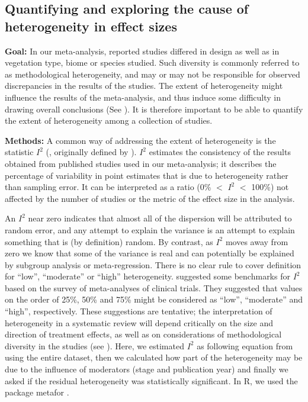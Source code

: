 \documentclass[10pt,twoside]{article}\usepackage[]{graphicx}\usepackage[]{color}
\begin{document}
\subsection{Quantifying and exploring the cause of heterogeneity in effect sizes}\label{app:heterogeneity}

\noindent\textbf{Goal:} In our meta-analysis, reported studies differed in design as well as in vegetation type, biome or species studied. Such diversity is commonly referred to as methodological heterogeneity, and may or may not be responsible for observed discrepancies in the results of the studies. The extent of heterogeneity might influence the results of the meta-analysis, and thus induce some difficulty in drawing overall conclusions (See \citealt{Higgins:2002iq}). It is therefore important to be able to quantify the extent of heterogeneity among a collection of studies.

\noindent\textbf{Methods:} A common way of addressing the extent of heterogeneity is the statistic $I^{2}$ (\citealt{Santos:2012gt}, originally defined by \citealt{Higgins:2002iq}). $I^{2}$ estimates the consistency of the results obtained from published studies used in our meta-analysis; it describes the percentage of variability in point estimates that is due to heterogeneity rather than sampling error. It can be interpreted as a ratio (0\% $<$ $I^{2}$ $<$ 100\%) not affected by the number of studies or the metric of the effect size in the analysis.

An $I^{2}$ near zero indicates that almost all of the dispersion will be attributed to random error, and any attempt to explain the variance is an attempt to explain something that is (by definition) random. By contrast, as $I^{2}$ moves away from zero we know that some of the variance is real and can potentially be explained by subgroup analysis or meta-regression.
There is no clear rule to cover definition for ``low'', ``moderate'' or ``high'' heterogeneity. \citealt{Higgins:2003hz} suggested some benchmarks for $I^{2}$ based on the survey of meta-analyses of clinical trials. They suggested that values on the order of 25\%, 50\% and 75\% might be considered as ``low'', ``moderate'' and ``high'', respectively. These suggestions are tentative; the interpretation of heterogeneity in a systematic review will depend critically on the size and direction of treatment effects, as well as on considerations of methodological diversity in the studies (see \citealt{Borenstein:2009um}).
Here, we estimated $I^{2}$ as following equation from \citealt{Higgins:2002iq} using the entire dataset, then we calculated how part of the heterogeneity may be due to the influence of moderators (stage and publication year) and finally we asked if the residual heterogeneity was statistically significant. In R, we used the package metafor  \citep{Viechtbauer-2010}.
\end{document}
